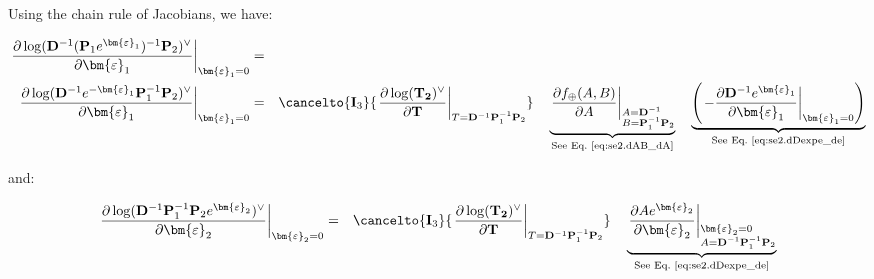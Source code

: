 \documentclass[a4paper,11pt]{report}
\newcommand{\E}{{\bm{\varepsilon}}}
\newcommand{\D}{{\mathbf{D}}}
\newcommand{\Pone}{\mathbf{P}_1}
\newcommand{\Ptwo}{\mathbf{P}_2}
\begin{document}
Using the chain rule of Jacobians, we have:

\begin{eqnarray}
\left. \frac{\partial \log( \D^{-1} (\Pone e^{\E_1} )^{-1} \Ptwo )^\vee}{\partial \E_1} \right|_{\E_1 = 0}
&=&
\nonumber \\
\left. \frac{\partial \log( \D^{-1} e^{-\E_1} \Pone^{-1} \Ptwo )^\vee}{\partial \E_1} \right|_{\E_1 = 0}
&=&
\cancelto{\mathbf{I}_3}{
\left.
 \frac{\partial \log(\mathbf{T_2})^\vee }{\partial \mathbf{T}}
\right|_{T=\D^{-1} \Pone^{-1} \Ptwo}
}
\quad
%
\underbrace{
\left. \frac{\partial f_\oplus(A,B) }{\partial A } \right|_{\begin{subarray}{l} A=\D^{-1} \\ B=\Pone^{-1}\Ptwo \end{subarray}}
}_{\text{See Eq.~\ref{eq:se2.dAB_dA}}}
\quad
%
\underbrace{
\left(
\left. - \frac{\partial \D^{-1} e^{\E_1} }{\partial \E_1} \right|_{\E_1 = 0}
\right)
}_{\text{See Eq.~\ref{eq:se2.dDexpe_de}}}
%
\nonumber
\\
%
\end{eqnarray}

\noindent and:

\begin{eqnarray}
\left. \frac{\partial \log( \D^{-1} \Pone ^{-1} \Ptwo e^{\E_2} )^\vee}{\partial \E_2} \right|_{\E_2 = 0}
&=&
\cancelto{\mathbf{I}_3}{
\left.
 \frac{\partial \log(\mathbf{T_2})^\vee }{\partial \mathbf{T}}
\right|_{T=\D^{-1} \Pone^{-1} \Ptwo}
}
\quad
%
\underbrace{
\left. \frac{\partial A e^{\E_2} }{\partial \E_2} \right|_{\begin{subarray}{l} \E_2=0\\ A= \D^{-1} \Pone ^{-1} \Ptwo\end{subarray}}
}_{\text{See Eq.~\ref{eq:se2.dDexpe_de}}}
%
\nonumber
\\
%
\end{eqnarray}





\end{document}
